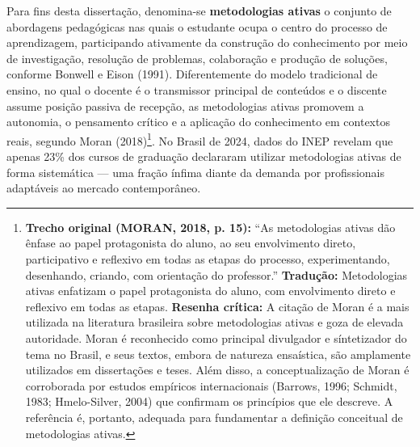 Para fins desta dissertação, denomina-se \textbf{metodologias ativas} o conjunto de abordagens pedagógicas nas quais o estudante ocupa o centro do processo de aprendizagem, participando ativamente da construção do conhecimento por meio de investigação, resolução de problemas, colaboração e produção de soluções, conforme Bonwell e Eison (1991). Diferentemente do modelo tradicional de ensino, no qual o docente é o transmissor principal de conteúdos e o discente assume posição passiva de recepção, as metodologias ativas promovem a autonomia, o pensamento crítico e a aplicação do conhecimento em contextos reais, segundo Moran (2018)\footnote{\textbf{Trecho original (MORAN, 2018, p. 15):} ``As metodologias ativas dão ênfase ao papel protagonista do aluno, ao seu envolvimento direto, participativo e reflexivo em todas as etapas do processo, experimentando, desenhando, criando, com orientação do professor.'' \textbf{Tradução:} Metodologias ativas enfatizam o papel protagonista do aluno, com envolvimento direto e reflexivo em todas as etapas. \textbf{Resenha crítica:} A citação de Moran é a mais utilizada na literatura brasileira sobre metodologias ativas e goza de elevada autoridade. Moran é reconhecido como principal divulgador e síntetizador do tema no Brasil, e seus textos, embora de natureza ensaística, são amplamente utilizados em dissertações e teses. Além disso, a conceptualização de Moran é corroborada por estudos empíricos internacionais (Barrows, 1996; Schmidt, 1983; Hmelo-Silver, 2004) que confirmam os princípios que ele descreve. A referência é, portanto, adequada para fundamentar a definição conceitual de metodologias ativas.}. No Brasil de 2024, dados do INEP revelam que apenas 23\% dos cursos de graduação declararam utilizar metodologias ativas de forma sistemática — uma fração ínfima diante da demanda por profissionais adaptáveis ao mercado contemporâneo.

